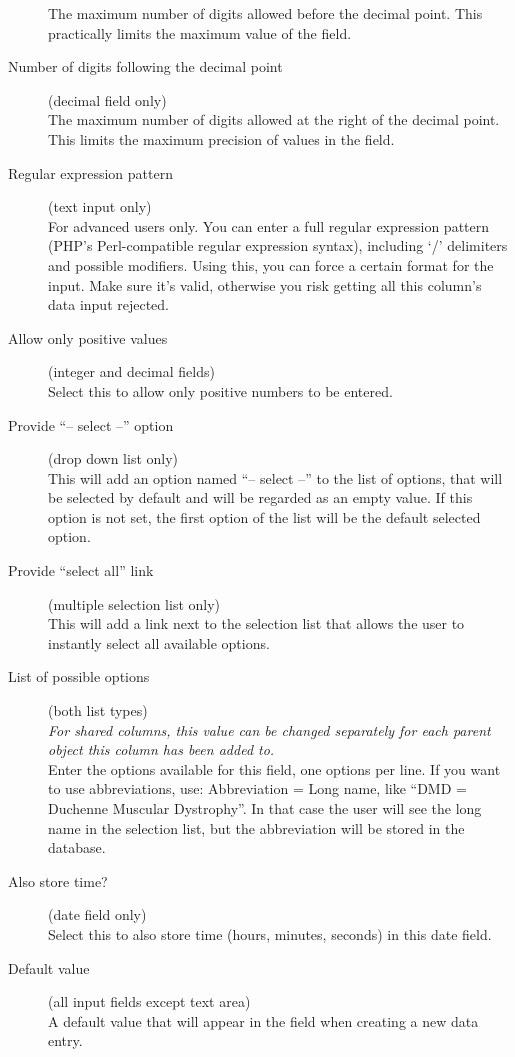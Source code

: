 \documentclass[a4paper,oneside,openany,12pt]{memoir}
\begin{document}
\begin{description}
  The maximum number of digits allowed before the decimal point.
  This practically limits the maximum value of the field.
  \item[Number of digits following the decimal point] (decimal field only)\hfill \\
  The maximum number of digits allowed at the right of the decimal point.
  This limits the maximum precision of values in the field.
  \item[Regular expression pattern] (text input only)\hfill \\
  For advanced users only.
  You can enter a full regular expression pattern (PHP's Perl-compatible regular expression syntax), including `/' delimiters and possible modifiers.
  Using this, you can force a certain format for the input.
  Make sure it's valid, otherwise you risk getting all this column's data input rejected.
  \item[Allow only positive values] (integer and decimal fields)\hfill \\
  Select this to allow only positive numbers to be entered.
  \item[Provide ``-- select --'' option] (drop down list only)\hfill \\
  This will add an option named ``-- select --'' to the list of options, that will be selected by default and will be regarded as an empty value.
  If this option is not set, the first option of the list will be the default selected option.
  \item[Provide ``select all'' link] (multiple selection list only)\hfill \\
  This will add a link next to the selection list that allows the user to instantly select all available options.
  \item[List of possible options] (both list types)\hfill \\
  \emph{For shared columns, this value can be changed separately for each parent object this column has been added to.}
  \\
  Enter the options available for this field, one options per line.
  If you want to use abbreviations, use: Abbreviation = Long name, like ``DMD = Duchenne Muscular Dystrophy''.
  In that case the user will see the long name in the selection list, but the abbreviation will be stored in the database.
  \item[Also store time?] (date field only)\hfill \\
  Select this to also store time (hours, minutes, seconds) in this date field.
  \item[Default value] (all input fields except text area)\hfill \\
  A default value that will appear in the field when creating a new data entry.
\end{description}
\end{document}
